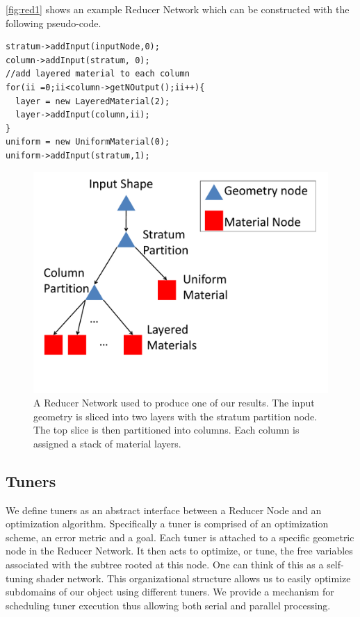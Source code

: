 \documentclass[annual]{acmsiggraph}
\begin{document}
\autoref{fig:red1} shows an example Reducer Network which can be constructed with the following pseudo-code.
\begin{verbatim}
stratum->addInput(inputNode,0);
column->addInput(stratum, 0);
//add layered material to each column
for(ii =0;ii<column->getNOutput();ii++){
  layer = new LayeredMaterial(2);
  layer->addInput(column,ii);
}
uniform = new UniformMaterial(0);
uniform->addInput(stratum,1);
\end{verbatim}

\begin{figure}[h]
\includegraphics[scale=0.3]{figure/redNetwork.pdf}
\caption{A Reducer Network used to produce one of our results.
The input geometry is sliced into two layers with the stratum partition node.
The top slice is then partitioned into columns. Each column is assigned
a stack of material layers.}
\label{fig:red1}
\end{figure}

\subsection{Tuners}
We define tuners as an abstract interface between a Reducer Node and an optimization algorithm.  Specifically a tuner is comprised of an optimization scheme, an error metric and a goal. Each tuner is attached to a specific geometric node in the Reducer Network. It then acts to optimize, or tune, the free variables associated with the subtree rooted at this node. One can think of this as a self-tuning shader network.  This organizational structure allows us to easily optimize subdomains of our object using different tuners. We provide a mechanism for scheduling tuner execution thus allowing both serial and parallel processing.
\end{document}
